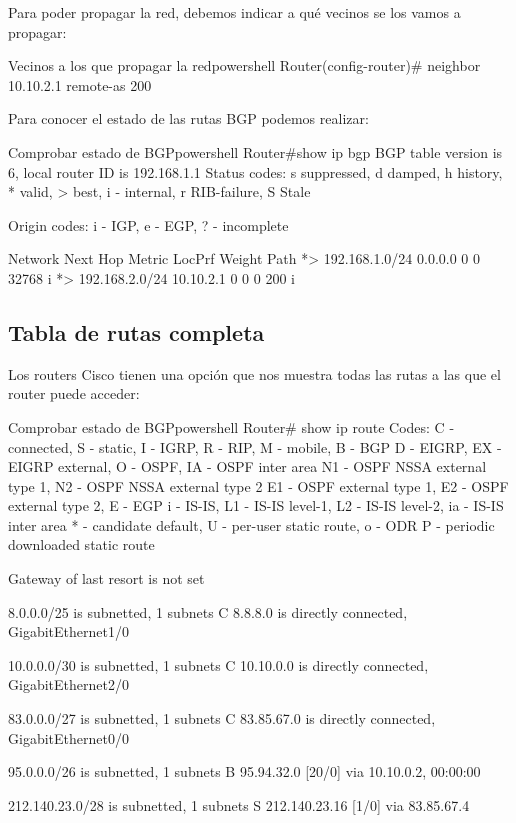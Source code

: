 Para poder propagar la red, debemos indicar a qué vecinos se los vamos a propagar:

\begin{mycode}{Vecinos a los que propagar la red}{powershell}{}
Router(config-router)# neighbor 10.10.2.1 remote-as 200
\end{mycode}

Para conocer el estado de las rutas BGP podemos realizar:

\begin{mycode}{Comprobar estado de BGP}{powershell}{}
Router#show ip bgp
BGP table version is 6, local router ID is 192.168.1.1
Status codes: s suppressed, d damped, h history, * valid, > best,
              i - internal, r RIB-failure, S Stale

Origin codes: i - IGP, e - EGP, ? - incomplete

Network               Next Hop           Metric LocPrf  Weight  Path
*> 192.168.1.0/24      0.0.0.0                0     0    32768       i
*> 192.168.2.0/24    10.10.2.1                0     0        0   200 i
\end{mycode}

\subsection{Tabla de rutas completa}
Los routers Cisco tienen una opción que nos muestra todas las rutas a las que el router puede acceder:

\begin{mycode}{Comprobar estado de BGP}{powershell}{{\small}}
Router# show ip route
Codes: C - connected, S - static, I - IGRP, R - RIP, M - mobile, B - BGP
    D - EIGRP, EX - EIGRP external, O - OSPF, IA - OSPF inter area
    N1 - OSPF NSSA external type 1, N2 - OSPF NSSA external type 2
    E1 - OSPF external type 1, E2 - OSPF external type 2, E - EGP
    i - IS-IS, L1 - IS-IS level-1, L2 - IS-IS level-2, ia - IS-IS inter area
    * - candidate default, U - per-user static route, o - ODR
    P - periodic downloaded static route

Gateway of last resort is not set

        8.0.0.0/25 is subnetted, 1 subnets
C       8.8.8.0 is directly connected, GigabitEthernet1/0

        10.0.0.0/30 is subnetted, 1 subnets
C       10.10.0.0 is directly connected, GigabitEthernet2/0

        83.0.0.0/27 is subnetted, 1 subnets
C       83.85.67.0 is directly connected, GigabitEthernet0/0

        95.0.0.0/26 is subnetted, 1 subnets
B       95.94.32.0 [20/0] via 10.10.0.2, 00:00:00

        212.140.23.0/28 is subnetted, 1 subnets
S       212.140.23.16 [1/0] via 83.85.67.4
\end{mycode}


